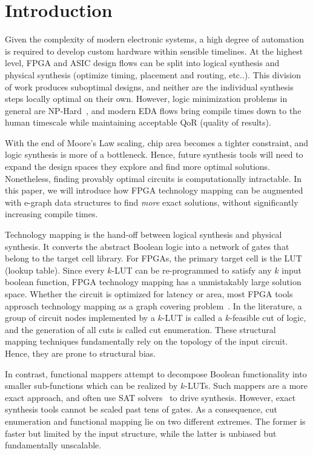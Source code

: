 \section{Introduction}\label{sec:intro}
Given the complexity of modern electronic systems, a high degree of automation
is required to develop custom hardware within sensible timelines. At the
highest level, FPGA and ASIC design flows can be split into logical synthesis
and physical synthesis (optimize timing, placement and routing, etc..). This
division of work produces suboptimal designs, and neither are the individual
synthesis steps locally optimal on their own. However, logic minimization
problems in general are NP-Hard~\cite{logicmin,twolevellogic}, and modern EDA
flows bring compile times down to the human timescale while maintaining
acceptable QoR (quality of results).

With the end of Moore's Law scaling, chip area becomes a tighter constraint,
and logic synthesis is more of a bottleneck. Hence, future synthesis tools will
need to expand the design spaces they explore and find more optimal solutions.
Nonetheless, finding provably optimal circuits is computationally intractable.
In this paper, we will introduce how FPGA technology mapping can be augmented
with e-graph data structures to find \textit{more} exact solutions, without
significantly increasing compile times.

Technology mapping is the hand-off between logical synthesis and physical
synthesis. It converts the abstract Boolean logic into a network of gates that
belong to the target cell library. For FPGAs, the primary target cell is the
LUT (lookup table). Since every $k$-LUT can be re-programmed to satisfy any $k$
input boolean function, FPGA technology mapping has a unmistakably large
solution space. Whether the circuit is optimized for latency or area, most FPGA
tools approach technology mapping as a graph covering problem~\cite{flowmap,
    daomap, attmap, imap}. In the literature, a group of circuit nodes implemented
by a $k$-LUT is called a $k$-feasible cut of logic, and the generation of all
cuts is called cut enumeration. These structural mapping techniques
fundamentally rely on the topology of the input circuit. Hence, they are prone
to structural bias.

In contrast, functional mappers attempt to decompose Boolean functionality into
smaller sub-functions which can be realized by $k$-LUTs. Such mappers are a
more exact approach, and often use SAT solvers~\cite{satmap,satmap2} to drive
synthesis. However, exact synthesis tools cannot be scaled past tens of gates.
As a consequence, cut enumeration and functional mapping lie on two different
extremes. The former is faster but limited by the input structure, while the
latter is unbiased but fundamentally unscalable.

